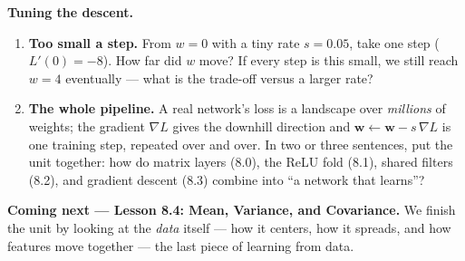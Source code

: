 \documentclass[10pt]{article}
\newcommand{\ww}{\mathbf{w}}
\begin{document}
\begin{extensionbox}
\textbf{Tuning the descent.}
\begin{enumerate}[label=(\alph*), leftmargin=1.8em, itemsep=5pt]
  \item \textbf{Too small a step.} From $w=0$ with a tiny rate $s=0.05$, take one step ($L'(0)=-8$). How far did
        $w$ move? If every step is this small, we still reach $w=4$ eventually --- what is the trade-off versus a
        larger rate?
  \item \textbf{The whole pipeline.} A real network's loss is a landscape over \emph{millions} of weights; the
        gradient $\nabla L$ gives the downhill direction and $\ww\leftarrow\ww-s\,\nabla L$ is one training step,
        repeated over and over. In two or three sentences, put the unit together: how do matrix layers (8.0),
        the ReLU fold (8.1), shared filters (8.2), and gradient descent (8.3) combine into ``a network that
        learns''?
\end{enumerate}
\end{extensionbox}

\begin{spiralbox}
\textbf{Coming next --- Lesson 8.4: Mean, Variance, and Covariance.} We finish the unit by looking at the
\emph{data} itself --- how it centers, how it spreads, and how features move together --- the last piece of
learning from data.
\end{spiralbox}
\end{document}
